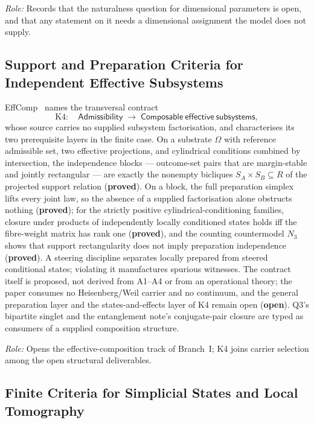 \documentclass[11pt,a4paper]{article}
\newcommand{\sproved}{\textcolor{cproved}{\textbf{proved}}}
\newcommand{\sopen}{\textcolor{copen}{\textbf{open}}}
\begin{document}
    \textit{Role:} Records that the naturalness question for dimensional parameters is open, and that
    any statement on it needs a dimensional assignment the model does not supply.

  \subsection{Support and Preparation Criteria for Independent Effective Subsystems}
    \label{sec:ecomp}

    EffComp~\cite{Beau2026esub} names the transversal contract
    \[
      \mathrm{K4}\colon\quad
      \mathsf{Admissibility}
      \;\longrightarrow\;
      \mathsf{Composable\ effective\ subsystems},
    \]
    whose source carries no supplied subsystem factorisation, and characterises its two prerequisite
    layers in the finite case.
    On a substrate $\Omega$ with reference admissible set, two effective projections, and cylindrical
    conditions combined by intersection, the independence blocks --- outcome-set pairs that are
    margin-stable and jointly rectangular --- are exactly the nonempty bicliques
    $S_A \times S_B \subseteq R$ of the projected support relation (\sproved).
    On a block, the full preparation simplex lifts every joint law, so the absence of a supplied
    factorisation alone obstructs nothing (\sproved); for the strictly positive cylindrical-conditioning
    families, closure under products of independently locally conditioned states holds iff the
    fibre-weight matrix has rank one (\sproved), and the counting countermodel $N_3$ shows that support
    rectangularity does not imply preparation independence (\sproved).
    A steering discipline separates locally prepared from steered conditional states; violating it
    manufactures spurious witnesses.
    The contract itself is proposed, not derived from A1--A4 or from an operational theory; the paper
    consumes no Heisenberg/Weil carrier and no continuum, and the general preparation layer and the
    states-and-effects layer of K4 remain open (\sopen).
    Q3's bipartite singlet and the entanglement note's conjugate-pair closure are typed as consumers of a
    supplied composition structure.

    \textit{Role:} Opens the effective-composition track of Branch~I; K4 joins carrier selection among
    the open structural deliverables.

  \subsection{Finite Criteria for Simplicial States and Local Tomography}
    \label{sec:steft}
\end{document}
